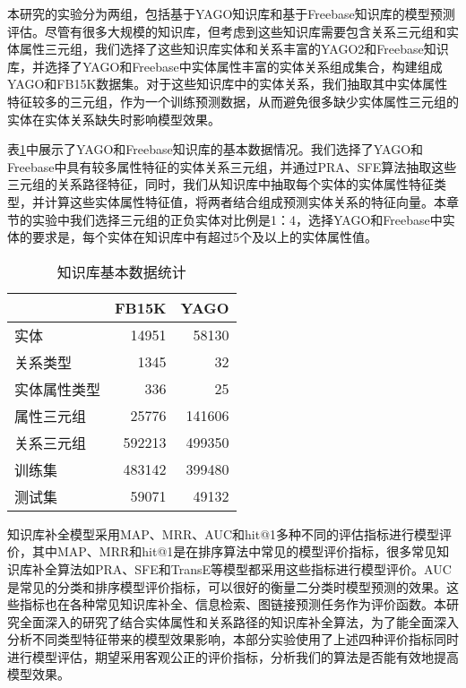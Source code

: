 本研究的实验分为两组，包括基于YAGO知识库和基于Freebase知识库的模型预测评估。尽管有很多大规模的知识库，但考虑到这些知识库需要包含关系三元组和实体属性三元组，我们选择了这些知识库实体和关系丰富的YAGO2和Freebase知识库，并选择了YAGO和Freebase中实体属性丰富的实体关系组成集合，构建组成YAGO和FB15K数据集。对于这些知识库中的实体关系，我们抽取其中实体属性特征较多的三元组，作为一个训练预测数据，从而避免很多缺少实体属性三元组的实体在实体关系缺失时影响模型效果。

表\ref{tab:addlabel-kbcExp-data}中展示了YAGO和Freebase知识库的基本数据情况。我们选择了YAGO和Freebase中具有较多属性特征的实体关系三元组，并通过PRA、SFE算法抽取这些三元组的关系路径特征，同时，我们从知识库中抽取每个实体的实体属性特征类型，并计算这些实体属性特征值，将两者结合组成预测实体关系的特征向量。本章节的实验中我们选择三元组的正负实体对比例是1：4，选择YAGO和Freebase中实体的要求是，每个实体在知识库中有超过5个及以上的实体属性值。

\begin{table}[htbp]
  \centering
  \caption{知识库基本数据统计}
    \begin{tabular}{|l|r|r|}
    \hline
    \textcolor[rgb]{ .141,  .161,  .18}{} & \multicolumn{1}{l|}{FB15K} & \multicolumn{1}{l|}{YAGO} \\
    \hline
    实体    & 14951 & 58130 \\
    \hline
    关系类型  & 1345  & 32 \\
    \hline
    实体属性类型 & 336   & 25 \\
    \hline
    属性三元组 & 25776 & 141606 \\
    \hline
    关系三元组 & 592213 & 499350 \\
    \hline
    训练集   & 483142 & 399480 \\
    \hline
    测试集   & 59071 & 49132 \\
    \hline
    \end{tabular}%
  \label{tab:addlabel-kbcExp-data}%
\end{table}%

知识库补全模型采用MAP、MRR、AUC和hit@1多种不同的评估指标进行模型评价，其中MAP、MRR和hit@1是在排序算法中常见的模型评价指标，很多常见知识库补全算法如PRA、SFE和TransE等模型都采用这些指标进行模型评价。AUC是常见的分类和排序模型评价指标，可以很好的衡量二分类时模型预测的效果。这些指标也在各种常见知识库补全、信息检索、图链接预测任务作为评价函数。本研究全面深入的研究了结合实体属性和关系路径的知识库补全算法，为了能全面深入分析不同类型特征带来的模型效果影响，本部分实验使用了上述四种评价指标同时进行模型评估，期望采用客观公正的评价指标，分析我们的算法是否能有效地提高模型效果。

